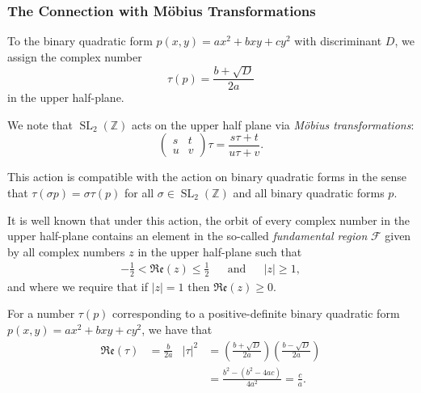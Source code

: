 \documentclass[handout]{beamer}
\begin{document}
\begin{frame}
	
	\frametitle{The Connection with M\"obius Transformations}

	To the binary quadratic form $p(x, y) = ax^2 + bxy + cy^2$ with discriminant $D$, we assign the complex number
	\[
		\tau(p) = \frac{b + \sqrt{D}}{2a}
	\]
	in the upper half-plane. \pause

	We note that $\operatorname{SL}_2(\mathbb{Z})$ acts on the upper half plane via \emph{M\"obius transformations}:
	\[
		\begin{pmatrix} s & t \\ u & v \end{pmatrix} \tau = \frac{s \tau + t}{u \tau + v}.
	\]
	\pause

	This action is compatible with the action on binary quadratic forms in the sense that $\tau (\sigma p) = \sigma \tau(p)$ for all $\sigma \in \operatorname{SL}_2(\mathbb{Z})$ and all binary quadratic forms $p$. \pause

\end{frame}

\begin{frame}
	
	It is well known that under this action, the orbit of every complex number in the upper half-plane contains an element in the so-called \emph{fundamental region} $\mathcal{F}$ given by all complex numbers $z$ in the upper half-plane such that
	\begin{align*}
		-\frac{1}{2} < \mathfrak{Re}(z) \leq \frac{1}{2} && \text{and} && |z| \geq 1,
	\end{align*}
	and where we require that if $|z| = 1$ then $\mathfrak{Re}(z) \geq 0$.
	\pause
	
	For a number $\tau(p)$ corresponding to a positive-definite binary quadratic form $p(x, y) = ax^2 + bxy + cy^2$, we have that
	\begin{align*}
		\mathfrak{Re}(\tau) & = \frac{b}{2a} & {|\tau|}^2 & = \left(\frac{b + \sqrt{D}}{2a}\right)\left(\frac{b - \sqrt{D}}{2a}\right) \\
		& & & = \frac{b^2 - (b^2 - 4ac)}{4a^2} = \frac{c}{a}.
	\end{align*}
	
\end{frame}
\end{document}
